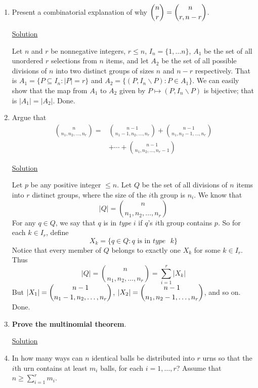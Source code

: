 \begin{enumerate}
\item Present a combinatorial explanation of why
$\dbinom{n}{r} = \dbinom{n}{r,n-r}$.

\underline{Solution}

Let $n$ and $r$ be nonnegative integers, $r \le n$, $I_n = \{1, \ldots n \}$,
$A_1$ be the set of all unordered $r$ selections from $n$ items, and let
$A_2$ be the set of all possible divisions of $n$ into two distinct groups of 
sizes $n$ and $n - r$ respectively. That is $A_1 = \{P \subseteq I_n: |P| = r\}$
and $A_2 = \{(P, I_n\backslash P) : P \in A_1\}$. We can easily show that the 
map from $A_1$ to $A_2$ given by $P \mapsto (P, I_n\backslash P)$ is bijective;
that is $|A_1| = |A_2|$. Done.

\item Argue that
\begin{align*}
\binom{n}{n_1,n_2,\ldots,n_r} = &\binom{n-1}{n_1-1,n_2,\ldots,n_r}+
\binom{n-1}{n_1,n_2-1,\ldots,n_r} \\
&+\cdots+\binom{n-1}{n_1,n_2,\ldots,n_r-1}
\end{align*}

\underline{Solution}

Let $p$ be any positive integer $\le n$. Let $Q$ be the set of all divisions of
$n$ items into $r$ distinct groups, where the size of the $i$th group is $n_i$. 
We know that
\[|Q| = \binom{n}{n_1,n_2,\ldots,n_r}\]
For any $q \in Q$, we say that $q$ is in \textit{type} $i$ if $q$'s $i$th group 
contains $p$. So for each $k \in I_r$, define
\[X_k = \{q \in Q : q \mbox{ is in }type\mbox{ }k\}\]
Notice that every member of $Q$ belongs to exactly one $X_k$ for some
$k \in I_r$. Thus
\[|Q| = \binom{n}{n_1,n_2,\ldots,n_r} = \sum_{i=1}^r|X_k|\]
But $|X_1| = \dbinom{n-1}{n_1-1,n_2,\ldots,n_r}$,
$|X_2| = \dbinom{n-1}{n_1,n_2-1,\ldots,n_r}$, and so on. Done.
\item \textbf{Prove the multinomial theorem}.

\underline{Solution}

\item In how many ways can $n$ identical balls be distributed into $r$ urns so 
that the $i$th urn contains at least $m_i$ balls, for each $i = 1, \ldots, r$? 
Assume that $n \ge \sum_{i=1}^rm_i$.


\end{enumerate}
